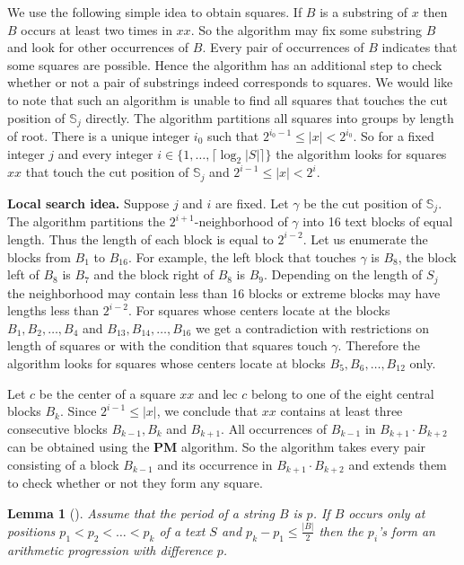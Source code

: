 \documentclass[10pt]{article}
\newtheorem{lem}[thm]{Lemma}
\newcommand{\slp}[1]{\mathbb{#1}}
\begin{document}
We use the following simple idea to obtain squares. If $B$ is a substring of $x$ then $B$ occurs at least two times in
$xx$. So the algorithm may fix some substring $B$ and look for other occurrences of $B$. Every pair of occurrences of
$B$ indicates that some squares are possible. Hence the algorithm has an additional step to check whether or
not a pair of substrings indeed corresponds to squares. We would like to note that such an algorithm is unable to find
all squares that touches the cut position of $\slp{S}_j$ directly. The algorithm partitions all squares into groups by length of
root. There is a unique integer $i_0$ such that $2^{i_0-1} \leq |x| < 2^{i_0}$. So for a fixed integer $j$ and every integer 
$i \in \{1, \dots, \lceil \log_2 |S| \rceil\}$ the algorithm looks for squares $xx$ that touch the cut position of $\slp{S}_j$ and 
$2^{i-1} \leq |x| < 2^i$.

\vspace{5pt}

\noindent \textbf{Local search idea.} Suppose $j$ and $i$ are fixed. Let $\gamma$ be the cut position of $\slp{S}_j$. 
The algorithm partitions the $2^{i+1}$-neighborhood of $\gamma$ into 16 text blocks of equal length. Thus the length of each block is
equal to $2^{i-2}$. Let us enumerate the blocks from $B_1$ to $B_{16}$. For example, the left block that
touches $\gamma$ is $B_8$, the block left of $B_8$ is $B_7$ and the block right of $B_8$ is $B_9$. Depending
on the length of $S_j$ the neighborhood may contain less than 16 blocks or extreme blocks may have lengths less than
$2^{i-2}$. For squares whose centers locate at the blocks $B_{1}, B_{2}, \dots, B_{4}$ and $B_{13}, B_{14}, \dots, B_{16}$ 
we get a contradiction with restrictions on length of squares or with the condition that squares touch $\gamma$.
Therefore the algorithm looks for squares whose centers locate at blocks $B_{5}, B_{6}, \dots, B_{12}$ only.

Let $c$ be the center of a square $xx$ and lec $c$ belong to one of the eight central blocks $B_k$. Since $2^{i-1}
\leq |x|$, we conclude that $xx$ contains at least three consecutive blocks $B_{k-1}, B_{k}$ and $B_{k+1}$. All occurrences of $B_{k-1}$ 
in $B_{k+1}\cdot B_{k+2}$ can be obtained using the \textbf{PM} algorithm. So the algorithm takes every pair consisting of a block
$B_{k-1}$ and its occurrence in $B_{k+1}\cdot B_{k+2}$ and extends them to check whether or not they form any square.

\begin{lem}[{\rm\cite{2}}]
\label{lem:blocks}
Assume that the period of a string $B$ is $p$. If $B$ occurs only at positions $p_1 < p_2 < \dots < p_k$ of a text
$S$ and $p_k - p_1 \leq \frac{|B|}{2}$ then the $p_i$'s form an arithmetic progression with difference $p$.
\end{lem}
\end{document}
